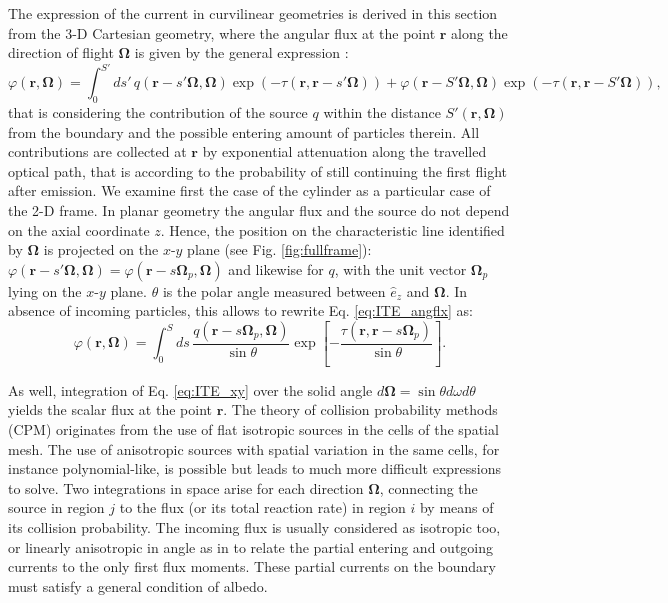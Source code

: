 \documentclass{ictt26}
\begin{document}
The expression of the current in curvilinear geometries is derived in this section from the 3-D Cartesian geometry, where the angular flux at the point $\mathbf{r}$ along the direction of flight $\mathbf{\Omega}$ is given by the general expression \cite{lewis1984computational}:
\begin{equation}
\varphi(\mathbf{r}, \mathbf{\Omega}) = \int_0^{S'}{ds'\, q(\mathbf{r} - s' \mathbf{\Omega}, \mathbf{\Omega}) \exp(-\tau(\mathbf{r}, \mathbf{r} - s' \mathbf{\Omega}))} + \varphi(\mathbf{r} - S' \mathbf{\Omega}, \mathbf{\Omega}) \exp(-\tau(\mathbf{r}, \mathbf{r} - S' \mathbf{\Omega})),
\label{eq:ITE_angflx}
\end{equation}
that is considering the contribution of the source $q$ within the distance $S'(\mathbf{r}, \mathbf{\Omega})$ from the boundary and the possible entering amount of particles therein. All contributions are collected at $\mathbf{r}$ by exponential attenuation along the travelled optical path, that is according to the probability of still continuing the first flight after emission. We examine first the case of the cylinder as a particular case of the 2-D frame. In planar geometry the angular flux and the source do not depend on the axial coordinate $z$. Hence, the position on the characteristic line identified by $\mathbf{\Omega}$ is projected on the $x$-$y$ plane (see Fig. \ref{fig:fullframe}): $\varphi(\mathbf{r} - s' \mathbf{\Omega},\mathbf{\Omega}) =\allowbreak \varphi(\mathbf{r} - s \mathbf{\Omega}_p,\mathbf{\Omega})$ and likewise for $q$, with the unit vector $\mathbf{\Omega}_p$ lying on the $x$-$y$ plane. $\theta$ is the polar angle measured between $\hat{e}_z$ and $\mathbf{\Omega}$. In absence of incoming particles, this allows to rewrite Eq. \ref{eq:ITE_angflx} as:
\begin{equation}
\varphi(\mathbf{r}, \mathbf{\Omega}) = \int_0^S{ds\, \frac{q(\mathbf{r} - s \mathbf{\Omega}_p, \mathbf{\Omega})}{\sin \theta} \exp \left[ -\frac{\tau(\mathbf{r}, \mathbf{r} - s \mathbf{\Omega}_p)}{\sin \theta} \right]}. %
\label{eq:ITE_xy}
\end{equation}

As well, integration of Eq. \ref{eq:ITE_xy} over the solid angle $d\mathbf{\Omega} = \sin \theta d\omega d \theta$ yields the scalar flux at the point $\mathbf{r}$. The theory of collision probability methods (CPM) originates from the use of flat isotropic sources in the cells of the spatial mesh. The use of anisotropic sources with spatial variation in the same cells, for instance polynomial-like, is possible but leads to much more difficult expressions to solve. Two integrations in space arise for each direction $\mathbf{\Omega}$, connecting the source in region $j$ to the flux (or its total reaction rate) in region $i$ by means of its collision probability. The incoming flux is usually considered as isotropic too, or linearly anisotropic in angle as in \cite{hebert2009applied} to relate the partial entering and outgoing currents to the only first flux moments. These partial currents on the boundary must satisfy a general condition of albedo.
\end{document}
